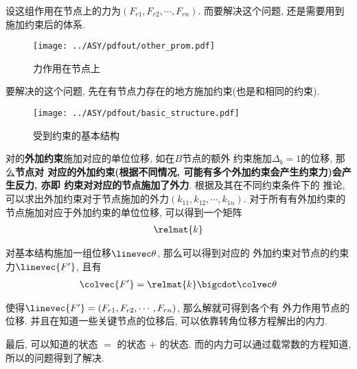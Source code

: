 设这组作用在节点上的力为$(F_{r1},F_{r2},\cdots,F_{rn})$. 
而要解决这个问题, 还是需要用到施加约束后的体系.
\begin{figure}[H]
\centering
\texttt{[image: ../ASY/pdfout/other\_prom.pdf]}
\caption{力作用在节点上}
\label{fig:figc}
\end{figure}

要解决的这个问题, 先在有节点力存在的地方施加约束(也是和相同的约束).

\begin{figure}[H]
\centering
\texttt{[image: ../ASY/pdfout/basic\_structure.pdf]}
\caption{受到约束的基本结构}
\label{fig:figd}
\end{figure}

对的{\bf 外加约束}施加对应的单位位移, 如在$B$节点的额外
约束施加$\Delta_b = 1$的位移, 那么{\bf 节点对 对应的外加约束(根据不同情况, 可能有多个外加约束会产生约束力)会产生反力, 亦即
约束对对应的节点施加了外力}. 根据及其在不同约束条件下的
推论, 可以求出外加约束对于节点施加的外力$(k_{11}, k_{12}, \cdots, k_{1n})$.
对于所有有外加约束的节点施加对应于外加约束的单位位移, 可以得到一个矩阵
\begin{align*}
\relmat{k}
\end{align*}

对基本结构施加一组位移$\linevec\theta$, 那么可以得到对应的
外加约束对节点的约束力$\linevec{F^\prime}$, 且有
\begin{align}
\label{equ:equd}
\colvec{F^\prime} = \relmat{k}\bigcdot\colvec\theta
\end{align}

使得$\linevec{F^\prime} = (F_{r1},F_{r2},\cdots,F_{rn})$, 那么解就可得到各个有
外力作用节点的位移. 并且在知道一些关键节点的位移后, 可以依靠转角位移方程解出的内力.

最后, 可以知道的状态 $=$ 的状态 $+$ 的状态.
而的内力可以通过载常数的方程知道, 所以的问题得到了解决.